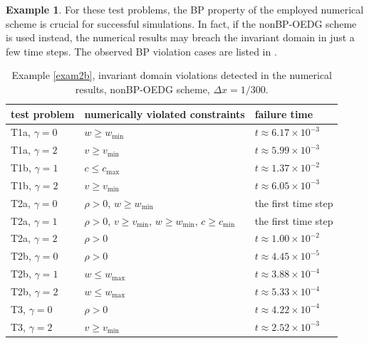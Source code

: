 \documentclass[times,final]{elsarticle}
\numberwithin{equation}{section}
\theoremstyle{definition}
\newtheorem{exa}[remark]{Example}
\theoremstyle{remark}
\begin{document}
\begin{exa}
	For these test problems, the BP property of the employed numerical scheme is crucial for successful simulations. In fact, if the nonBP-OEDG scheme is used instead, the numerical results may breach the invariant domain in just a few time steps. The observed BP violation cases are listed in .
	
	
	\begin{table}[h!]
		\renewcommand{\arraystretch}{1.3}
		\centering
		\caption{\sf Example \ref{exam2b}, invariant domain violations detected in the numerical results, nonBP-OEDG scheme, $\Delta x = 1/300$.}
		\begin{tabular}{lll}
			
			\toprule[1.5pt]
			
			test problem & numerically violated constraints & failure time \\
			
			\midrule[1.5pt]
			
			T1a, $\gamma = 0$ & $w \ge w_{\min}$ & $t \approx 6.17\times 10^{-3}$ \\
			T1a, $\gamma = 2$ & $v \ge v_{\min}$ & $t \approx 5.99\times 10^{-3}$ \\
			T1b, $\gamma = 1$ & $c \le c_{\max}$ & $t \approx 1.37\times 10^{-2}$ \\
			T1b, $\gamma = 2$ & $v \ge v_{\min}$ & $t \approx 6.05\times 10^{-3}$ \\
			T2a, $\gamma = 0$ & $\rho > 0$, $w \ge w_{\min}$ & the first time step \\
			T2a, $\gamma = 1$ & $\rho > 0$, $v \ge v_{\min}$, $w \ge w_{\min}$, $c \ge c_{\min}$ & the first time step \\
			T2a, $\gamma = 2$ & $\rho > 0$ & $t \approx 1.00\times 10^{-2}$ \\
			T2b, $\gamma = 0$ & $\rho > 0$ & $t \approx 4.45\times 10^{-5}$ \\
			T2b, $\gamma = 1$ & $w \le w_{\max}$ & $t \approx 3.88\times 10^{-4}$ \\
			T2b, $\gamma = 2$ & $w \le w_{\max}$ & $t \approx 5.33\times 10^{-4}$ \\
			T3, $\gamma = 0$ & $\rho > 0$ & $t \approx 4.22\times 10^{-4}$ \\
			T3, $\gamma = 2$ & $v \ge v_{\min}$ & $t \approx 2.52\times 10^{-3}$ \\
			
			\bottomrule[1.5pt]
			
		\end{tabular}
		\label{Table3}
	\end{table}
	

\end{exa}
\end{document}
